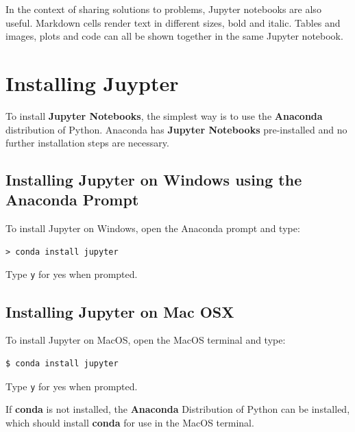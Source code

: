 \documentclass{book}
\begin{document}
In the context of sharing solutions to problems, Jupyter notebooks are
also useful. Markdown cells render text in different sizes, bold and
italic. Tables and images, plots and code can all be shown together in
the same Jupyter notebook.
    




    
        \section{Installing Juypter}\label{installing-juypter}
    




    
        To install \textbf{Jupyter Notebooks}, the simplest way is to use the
\textbf{Anaconda} distribution of Python. Anaconda has \textbf{Jupyter
Notebooks} pre-installed and no further installation steps are
necessary.
    




    
        \subsection{Installing Jupyter on Windows using the Anaconda
Prompt}\label{installing-jupyter-on-windows-using-the-anaconda-prompt}

To install Jupyter on Windows, open the Anaconda prompt and type:

\begin{lstlisting}
> conda install jupyter
\end{lstlisting}

Type \lstinline!y! for yes when prompted.
    




    
        \subsection{Installing Jupyter on Mac
OSX}\label{installing-jupyter-on-mac-osx}

To install Jupyter on MacOS, open the MacOS terminal and type:

\begin{lstlisting}
$ conda install jupyter
\end{lstlisting}

Type \lstinline!y! for yes when prompted.

If \textbf{conda} is not installed, the \textbf{Anaconda} Distribution
of Python can be installed, which should install \textbf{conda} for use
in the MacOS terminal.
\end{document}
